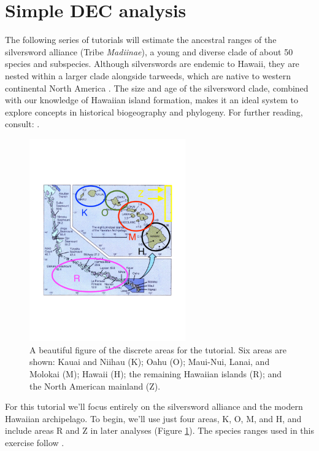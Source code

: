 

\section{Simple DEC analysis} \label{sec:bg_simple}


The following series of tutorials will estimate the ancestral ranges of the silversword alliance (Tribe {\it Madiinae}), a young and diverse clade of about 50 species and subspecies.
Although silverswords are endemic to Hawaii, they are nested within a larger clade alongside tarweeds, which are native to western continental North America \citep{Baldwin1991}.
The size and age of the silversword clade, combined with our knowledge of Hawaiian island formation, makes it an ideal system to explore concepts in historical biogeography and phylogeny.
For further reading, consult: \citet{Carlquist1959, Baldwin1998}.
 
\begin{figure}[!ht]
\centering
\includegraphics[width=0.6\textwidth]{figures/fig_hawaii_areas.pdf}
\caption{A beautiful figure of the discrete areas for the tutorial. Six areas are shown: Kauai and Niihau (K); Oahu (O); Maui-Nui, Lanai, and Molokai (M); Hawaii (H); the remaining Hawaiian islands (R); and the North American mainland (Z).}
\label{fig:hawaii_areas}
\end{figure}
 
For this tutorial we'll focus entirely on the silversword alliance and the modern Hawaiian archipelago.
To begin, we'll use just four areas, K, O, M, and H, and include areas R and Z in later analyses (Figure \ref{fig:hawaii_areas}).
The species ranges used in this exercise follow \citet{Gillespie2009}.

